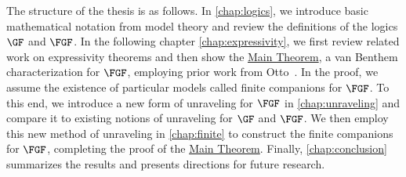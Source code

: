 The structure of the thesis is as follows.
In \cref{chap:logics}, we introduce basic mathematical notation from model theory and review the definitions of the logics $\GF$ and $\FGF$.
In the following chapter \cref{chap:expressivity}, we first review related work on expressivity theorems and then show the \hyperref[thm:main]{Main Theorem}, a van Benthem characterization for $\FGF$, employing prior work from Otto~\cite{Otto04,Otto2012}.
In the proof, we assume the existence of particular models called finite companions for $\FGF$.
To this end, we introduce a new form of unraveling for $\FGF$  in \cref{chap:unraveling} and compare it to existing notions of unraveling for $\GF$ and $\FGF$.
We then employ this new method of unraveling in \cref{chap:finite} to construct the finite companions for $\FGF$, completing the proof of the \hyperref[thm:main]{Main Theorem}.
Finally, \cref{chap:conclusion} summarizes the results and presents directions for future research.
